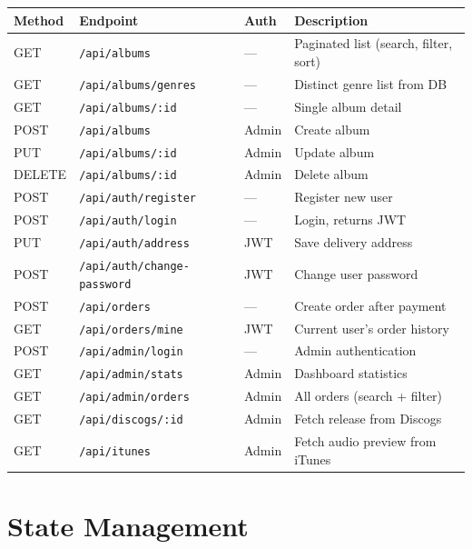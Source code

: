 \documentclass[11pt, a4paper]{report}
\begin{document}
\vspace{4pt}
\begin{tabularx}{\linewidth}{C{1.1cm} L{5.2cm} C{1.5cm} X}
  \toprule
  \textbf{Method} & \textbf{Endpoint} & \textbf{Auth} & \textbf{Description} \\
  \midrule
  GET    & \texttt{/api/albums}                  & —     & Paginated list (search, filter, sort) \\
  GET    & \texttt{/api/albums/genres}            & —     & Distinct genre list from DB \\
  GET    & \texttt{/api/albums/:id}               & —     & Single album detail \\
  POST   & \texttt{/api/albums}                   & Admin & Create album \\
  PUT    & \texttt{/api/albums/:id}               & Admin & Update album \\
  DELETE & \texttt{/api/albums/:id}               & Admin & Delete album \\
  POST   & \texttt{/api/auth/register}            & —     & Register new user \\
  POST   & \texttt{/api/auth/login}               & —     & Login, returns JWT \\
  PUT    & \texttt{/api/auth/address}             & JWT   & Save delivery address \\
  POST   & \texttt{/api/auth/change-password}     & JWT   & Change user password \\
  POST   & \texttt{/api/orders}                   & —     & Create order after payment \\
  GET    & \texttt{/api/orders/mine}              & JWT   & Current user's order history \\
  POST   & \texttt{/api/admin/login}              & —     & Admin authentication \\
  GET    & \texttt{/api/admin/stats}              & Admin & Dashboard statistics \\
  GET    & \texttt{/api/admin/orders}             & Admin & All orders (search + filter) \\
  GET    & \texttt{/api/discogs/:id}              & Admin & Fetch release from Discogs \\
  GET    & \texttt{/api/itunes}                   & Admin & Fetch audio preview from iTunes \\
  \bottomrule
\end{tabularx}

\section{State Management}
\end{document}
